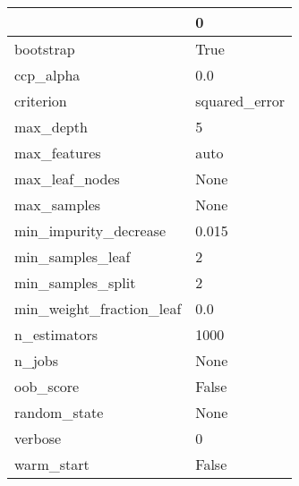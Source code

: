 \begin{tabular}{ll}
\toprule
{} &              0 \\
\midrule
bootstrap                &           True \\
ccp\_alpha                &            0.0 \\
criterion                &  squared\_error \\
max\_depth                &              5 \\
max\_features             &           auto \\
max\_leaf\_nodes           &           None \\
max\_samples              &           None \\
min\_impurity\_decrease    &          0.015 \\
min\_samples\_leaf         &              2 \\
min\_samples\_split        &              2 \\
min\_weight\_fraction\_leaf &            0.0 \\
n\_estimators             &           1000 \\
n\_jobs                   &           None \\
oob\_score                &          False \\
random\_state             &           None \\
verbose                  &              0 \\
warm\_start               &          False \\
\bottomrule
\end{tabular}
